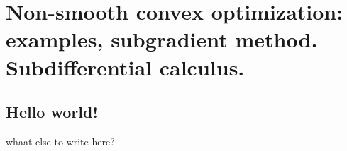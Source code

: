 \chapter{Non-smooth convex optimization: examples, subgradient method. Subdifferential calculus.}
\section{Hello world!}
whaat else to write here?

